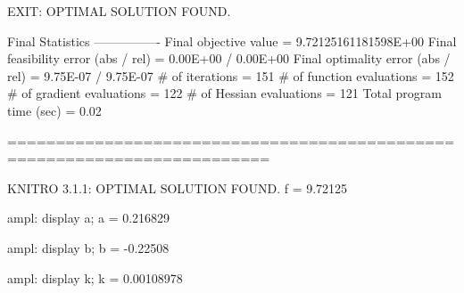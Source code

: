 EXIT: OPTIMAL SOLUTION FOUND.
 
Final Statistics
----------------
Final objective value               =     9.72125161181598E+00
Final feasibility error (abs / rel) =     0.00E+00 / 0.00E+00
Final optimality error  (abs / rel) =     9.75E-07 / 9.75E-07
# of iterations                     =        151
# of function evaluations           =        152
# of gradient evaluations           =        122
# of Hessian evaluations            =        121
Total program time (sec)            =     0.02
 
=========================================================================
 
KNITRO 3.1.1: OPTIMAL SOLUTION FOUND.
f = 9.72125
 
ampl: display a;
a = 0.216829
 
ampl: display b;
b = -0.22508
 
ampl: display k;
k = 0.00108978

